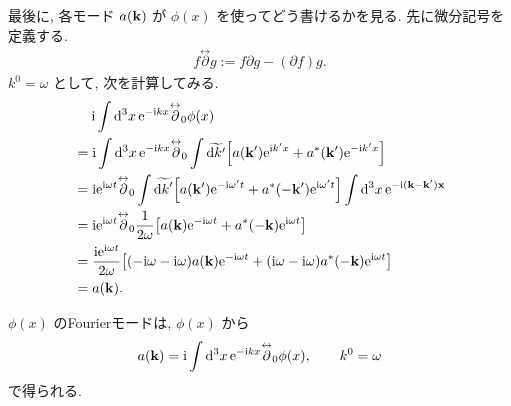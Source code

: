 \documentclass[../note01.tex]{subfiles}
\begin{document}
最後に, 各モード $ a(\vb{k}) $ が $ \phi(x) $ を使ってどう書けるかを見る. 先に微分記号を定義する.
\begin{align}
    f\overset{\leftrightarrow}{\partial} g := f\partial g - (\partial f)g.
\end{align}
$ k^0=\omega $ として, 次を計算してみる.
\begin{align*}
    &\quad\;\mathrm{i}\int\dd[3]{x} \mathrm{e}^{-\mathrm{i} kx}\overset{\leftrightarrow}{\partial}_0\phi(x) \\
    &= \mathrm{i}\int\dd[3]{x} \mathrm{e}^{-\mathrm{i} kx}\overset{\leftrightarrow}{\partial}_0 \int\widetilde{\dd{k'}} \qty[a(\vb{k}')\mathrm{e}^{\mathrm{i} k'x} + a^*(\vb{k}')\mathrm{e}^{-\mathrm{i} k'x}] \\
    &= \mathrm{i}\mathrm{e}^{\mathrm{i}\omega t}\overset{\leftrightarrow}{\partial}_0 \int\widetilde{\dd{k}'} \qty[a(\vb{k}')\mathrm{e}^{-\mathrm{i}\omega't} + a^*(-\vb{k}')\mathrm{e}^{\mathrm{i}\omega't}] \int\dd[3]{x}\mathrm{e}^{-\mathrm{i}(\vb{k}-\vb{k}')\vb{x}} \\
    &= \mathrm{i}\mathrm{e}^{\mathrm{i}\omega t}\overset{\leftrightarrow}{\partial}_0 \frac{1}{2\omega} \qty[a(\vb{k})\mathrm{e}^{-\mathrm{i}\omega t} + a^*(-\vb{k})\mathrm{e}^{\mathrm{i}\omega t}] \\
    &= \frac{\mathrm{i}\mathrm{e}^{\mathrm{i}\omega t}}{2\omega} \qty[(-\mathrm{i}\omega-\mathrm{i}\omega)a(\vb{k})\mathrm{e}^{-\mathrm{i}\omega t} + (\mathrm{i}\omega-\mathrm{i}\omega)a^*(\vb{-k})\mathrm{e}^{\mathrm{i}\omega t}] \\
    &= a(\vb{k}).
\end{align*}
\begin{kekka}
    $ \phi(x) $ のFourierモードは, $ \phi(x) $ から
    \begin{align}\label{mode}
        a(\vb{k}) = \mathrm{i}\int\dd[3]{x} \mathrm{e}^{-\mathrm{i} kx}\overset{\leftrightarrow}{\partial}_0\phi(x), \qquad k^0=\omega
    \end{align}
    で得られる.
\end{kekka}
\end{document}
